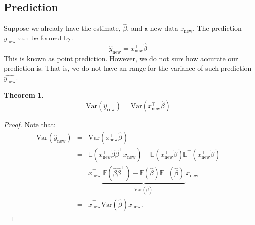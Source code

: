 \documentclass{article}
\theoremstyle{MyNonumberplain}
\theoremstyle{break}
\newtheorem*{proof}{Proof. }
\newcommand{\ev}{\mathbb{E}}
\newcommand{\var}{\text{Var}}
\newcommand{\T}{^\intercal}
\theoremstyle{break}
\newtheorem{theorem}{Theorem}[section]
\theoremstyle{break}
\theoremstyle{break}
\begin{document}
\subsection{Prediction}

Suppose we already have the estimate, $\hat\beta$, and a new data $x_{\text{new}}$. The prediction $y_{\text{new}}$ can be formed by:
    $$\hat{y}_{\text{new}}=x_{\text{new}}\T\hat\beta$$
This is known as point prediction. 
However, we do not sure how accurate our prediction is. 
That is, we do not have an range for the variance of such prediction $\hat{y_{\text{new}}}$.

\begin{thmbox}
    \begin{theorem}
        $$\var(\hat{y}_{\text{new}}) = \var({x}_{\text{new}}\T\hat\beta)$$
    \end{theorem}
    \begin{prfbox}
        \begin{proof}
            Note that:
        \begin{eqnarray*}
            \var(\hat{y}_{\text{new}}) &=& \var({x}_{\text{new}}\T\hat\beta)\\
                                    &=& \ev({x}_{\text{new}}\T\hat\beta\hat\beta\T {x}_{\text{new}}) - \ev({x}_{\text{new}}\T\hat\beta)\ev\T({x}_{\text{new}}\T\hat\beta)\\
                                    &=& {x}_{\text{new}}\T \underbrace{\Biggl[\ev(\hat\beta\hat\beta\T) - \ev(\hat\beta)\ev\T(\hat\beta)\Biggr]}_{\var(\hat\beta)} {x}_{\text{new}}\\
                                    &=& {x}_{\text{new}}\T\var(\hat\beta){x}_{\text{new}}.
        \end{eqnarray*}

        \end{proof}
    \end{prfbox}
\end{thmbox}


\begin{center}
\end{center}
\end{document}
